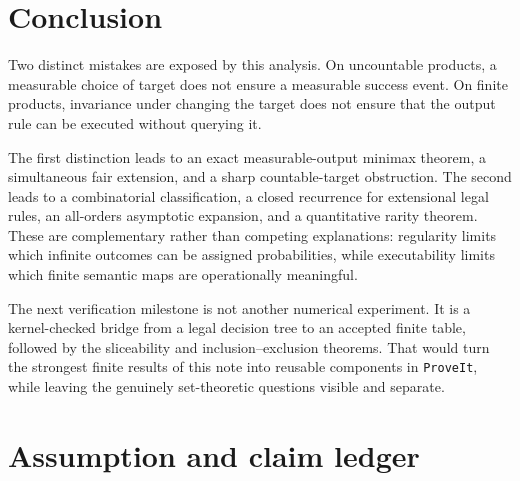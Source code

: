 \documentclass[11pt,letterpaper]{article}
\theoremstyle{definition}
\newcommand{\repo}{\texttt{ProveIt}}
\begin{document}
\section{Conclusion}

Two distinct mistakes are exposed by this analysis. On uncountable products, a measurable choice of target does not ensure a measurable success event. On finite products, invariance under changing the target does not ensure that the output rule can be executed without querying it.

The first distinction leads to an exact measurable-output minimax theorem, a simultaneous fair extension, and a sharp countable-target obstruction. The second leads to a combinatorial classification, a closed recurrence for extensional legal rules, an all-orders asymptotic expansion, and a quantitative rarity theorem. These are complementary rather than competing explanations: regularity limits which infinite outcomes can be assigned probabilities, while executability limits which finite semantic maps are operationally meaningful.

The next verification milestone is not another numerical experiment. It is a kernel-checked bridge from a legal decision tree to an accepted finite table, followed by the sliceability and inclusion--exclusion theorems. That would turn the strongest finite results of this note into reusable components in \repo, while leaving the genuinely set-theoretic questions visible and separate.

\appendix
\section{Assumption and claim ledger}
\label{mbg:app:ledger}
\end{document}
